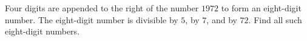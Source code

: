 Four digits are appended to the right of the number $1972$ to form an eight-digit number. The eight-digit number is divisible by $5$, by $7$, and by $72$. Find all such eight-digit numbers.

